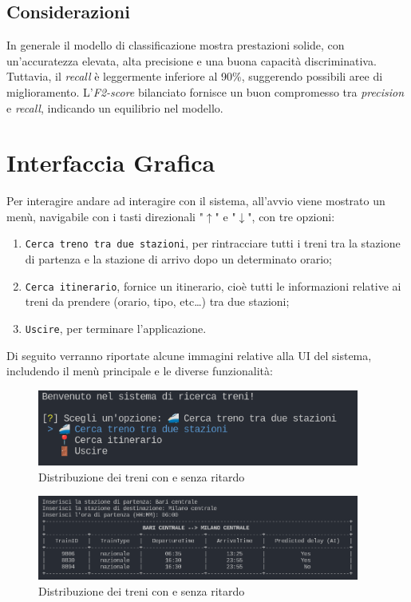 \documentclass[italian,12pt,a4paper]{article}
\begin{document}
			\subsection{Considerazioni}
				In generale il modello di classificazione mostra prestazioni solide, con un'accuratezza elevata, alta precisione e una buona capacità discriminativa. \\Tuttavia, il \textit{recall} è leggermente inferiore al 90\%, suggerendo possibili aree di miglioramento. L'\textit{F2-score} bilanciato fornisce un buon compromesso tra \textit{precision} e \textit{recall}, indicando un equilibrio nel modello. 

	\section{Interfaccia Grafica}
	Per interagire andare ad interagire con il sistema, all'avvio viene mostrato un menù, navigabile con i tasti direzionali "$\uparrow$" e "$\downarrow$", con tre opzioni:
	
		\begin{enumerate}
			\item \texttt{Cerca treno tra due stazioni}, per rintracciare tutti i treni tra la stazione di partenza e la stazione di arrivo dopo un determinato orario;
			\item \texttt{Cerca itinerario}, fornice un itinerario, cioè tutti le informazioni relative ai treni da prendere (orario, tipo, etc\dots) tra due stazioni;
			\item \texttt{Uscire}, per terminare l'applicazione.
		\end{enumerate} 
		Di seguito verranno riportate alcune immagini relative alla UI del sistema, includendo il menù principale e le diverse funzionalità:
		
		\begin{figure}[!h]
			\centering
			\includegraphics[width=400px]{img/main_menu}
			\caption{Distribuzione dei treni con e senza ritardo}
		\end{figure}

		\begin{figure}[!h]
			\centering
			\includegraphics[width=400px]{img/search_train}
			\caption{Distribuzione dei treni con e senza ritardo}
		\end{figure}
\end{document}
